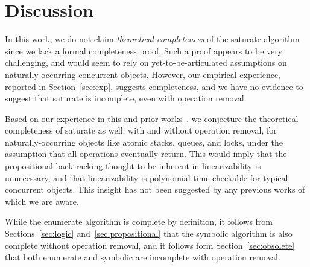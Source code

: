 \section{Discussion}
\label{sec:discussion}

In this work, we do not claim \emph{theoretical completeness} of the {\sc
saturate} algorithm since we lack a formal completeness proof. Such a proof
appears to be very challenging, and would seem to rely on yet-to-be-articulated
assumptions on naturally-occurring concurrent objects. However, our empirical
experience, reported in Section~\ref{sec:exp}, suggests completeness, and we
have no evidence to suggest that {\sc saturate} is incomplete, even with
operation removal.

Based on our experience in this and prior works~\cite{ conf/esop/BouajjaniEEH13,
conf/popl/BouajjaniEEH15}, we conjecture the theoretical completeness of {\sc
saturate} as well, with and without operation removal, for naturally-occurring
objects like atomic stacks, queues, and locks, under the assumption that all
operations eventually return. This would imply that the propositional
backtracking thought to be inherent in linearizability is unnecessary, and that
linearizability is polynomial-time checkable for typical concurrent objects.
This insight has not been suggested by any previous works of which we are aware.

While the {\sc enumerate} algorithm is complete by definition, it follows from
Sections~\ref{sec:logic} and~\ref{sec:propositional} that the {\sc symbolic}
algorithm is also complete without operation removal, and it follows form
Section~\ref{sec:obsolete} that both {\sc enumerate} and {\sc symbolic} are
incomplete with operation removal.
